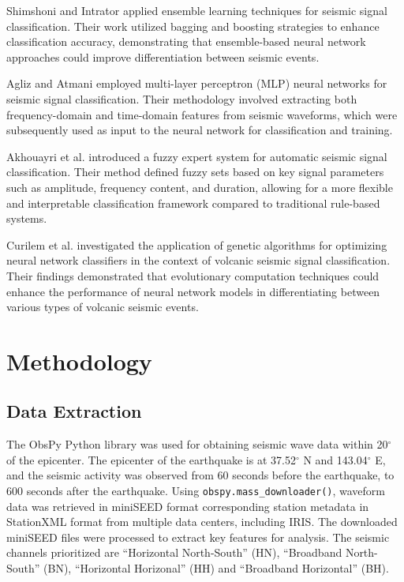 \documentclass[conference]{IEEEtran}
\begin{document}
Shimshoni and Intrator \cite{b7} applied
ensemble learning techniques for seismic signal classification. Their work
utilized bagging and boosting strategies to enhance classification accuracy,
demonstrating that ensemble-based neural network approaches could improve
differentiation between seismic events.


Agliz and Atmani \cite{b8} employed
multi-layer perceptron (MLP) neural networks for seismic signal classification.
Their methodology involved extracting both frequency-domain and time-domain
features from seismic waveforms, which were subsequently used as input to the
neural network for classification and training.


Akhouayri et al. \cite{b9}
introduced a fuzzy expert system for automatic seismic signal classification.
Their method defined fuzzy sets based on key signal parameters such as
amplitude, frequency content, and duration, allowing for a more flexible and
interpretable classification framework compared to traditional rule-based
systems.


Curilem et al. \cite{b10} investigated the application of genetic
algorithms for optimizing neural network classifiers in the context of volcanic
seismic signal classification. Their findings demonstrated that evolutionary
computation techniques could enhance the performance of neural network models in
differentiating between various types of volcanic seismic events.
\section{Methodology}
\label{sec:org07ff969}
\subsection{Data Extraction}
\label{sec:orgb307f39}
The ObsPy Python library was used for obtaining seismic wave data within
20\(^{\circ}\) of the epicenter. The epicenter of the earthquake is at
37.52\(^{\circ}\) N and 143.04\(^{\circ}\) E, and the seismic activity was
observed from 60 seconds before the earthquake, to 600 seconds after the
earthquake. Using \texttt{obspy.mass\_downloader()}, waveform data was retrieved
in miniSEED format corresponding station metadata in StationXML format from
multiple data centers, including IRIS. The downloaded miniSEED files were
processed to extract key features for analysis. The seismic channels prioritized
are ``Horizontal North-South'' (HN), ``Broadband North-South'' (BN), ``Horizontal
Horizonal'' (HH) and ``Broadband Horizontal'' (BH).
\end{document}
